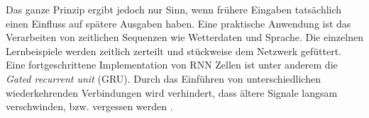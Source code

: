 Das ganze Prinzip ergibt jedoch nur Sinn, wenn frühere Eingaben tatsächlich einen Einfluss auf spätere Ausgaben haben. Eine praktische Anwendung ist das Verarbeiten von zeitlichen Sequenzen wie Wetterdaten und Sprache. Die einzelnen Lernbeispiele werden  zeitlich zerteilt und stückweise dem Netzwerk gefüttert.
Eine fortgeschrittene Implementation von RNN Zellen ist unter anderem die \textit{Gated recurrent unit} (GRU)\parencite{gru}. Durch das Einführen von unterschiedlichen wiederkehrenden Verbindungen wird verhindert, dass ältere Signale langsam verschwinden, bzw. vergessen werden \parencite{chollet}.